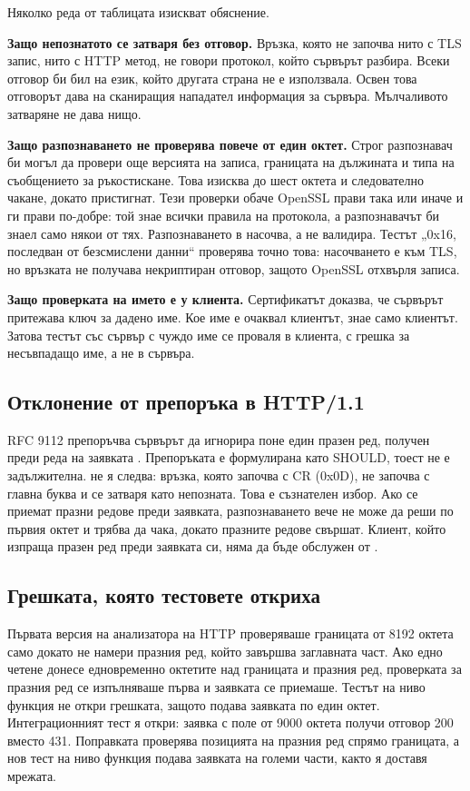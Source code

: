 Няколко реда от таблицата изискват обяснение.

\textbf{Защо непознатото се затваря без отговор.} Връзка, която не започва нито с TLS
запис, нито с HTTP метод, не говори протокол, който сървърът разбира. Всеки отговор би
бил на език, който другата страна не е използвала. Освен това отговорът дава на
сканиращия нападател информация за сървъра. Мълчаливото затваряне не дава нищо.

\textbf{Защо разпознаването не проверява повече от един октет.} Строг разпознавач би
могъл да провери още версията на записа, границата на дължината и типа на съобщението
за ръкостискане. Това изисква до шест октета и следователно чакане, докато пристигнат.
Тези проверки обаче OpenSSL прави така или иначе и ги прави по-добре: той знае всички
правила на протокола, а разпознавачът би знаел само някои от тях. Разпознаването в
 насочва, а не валидира. Тестът „0x16, последван от безсмислени данни“
проверява точно това: насочването е към TLS, но връзката не получава некриптиран
отговор, защото OpenSSL отхвърля записа.

\textbf{Защо проверката на името е у клиента.} Сертификатът доказва, че сървърът
притежава ключ за дадено име. Кое име е очаквал клиентът, знае само клиентът. Затова
тестът със сървър с чуждо име се проваля в клиента, с грешка за несъвпадащо име, а не в
сървъра.

\subsection{Отклонение от препоръка в HTTP/1.1}

RFC 9112 препоръчва сървърът да игнорира поне един празен ред, получен преди реда на
заявката \cite[раздел 2.2]{rfc9112}. Препоръката е формулирана като SHOULD, тоест не е
задължителна.  не я следва: връзка, която започва с CR (0x0D), не започва с
главна буква и се затваря като непозната. Това е съзнателен избор. Ако се приемат
празни редове преди заявката, разпознаването вече не може да реши по първия октет и
трябва да чака, докато празните редове свършат. Клиент, който изпраща празен ред преди
заявката си, няма да бъде обслужен от .

\subsection{Грешката, която тестовете откриха}
\label{sec:bug}

Първата версия на анализатора на HTTP проверяваше границата от 8192 октета само докато
не намери празния ред, който завършва заглавната част. Ако едно четене донесе
едновременно октетите над границата и празния ред, проверката за празния ред се
изпълняваше първа и заявката се приемаше. Тестът на ниво функция не откри грешката,
защото подава заявката по един октет. Интеграционният тест я откри: заявка с поле от 9000
октета получи отговор 200 вместо 431. Поправката проверява позицията на празния ред
спрямо границата, а нов тест на ниво функция подава заявката на големи части, както я
доставя мрежата.

